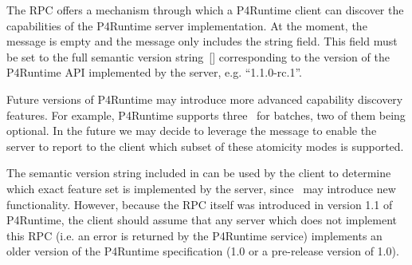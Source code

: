 \documentclass[11pt]{article}
\begin{document}
{%
\noindent{}The  RPC offers a mechanism through which a P4Runtime client can
discover the capabilities of the P4Runtime server implementation. At the moment,
the  message is empty and the 
message only includes the  string field. This field must
be set to the full semantic version string~[] corresponding to the
version of the P4Runtime API implemented by the server, e.g. \textquotedblleft{}1.1.0-rc.1\textquotedblright{}.%

Future versions of P4Runtime may introduce more advanced capability discovery
features. For example, P4Runtime supports three~ for  batches, two of them being
optional. In the future we may decide to leverage the 
message to enable the server to report to the client which subset of these
atomicity modes is supported.%

The semantic version string included in  can be used by
the client to determine which exact feature set is implemented by the server,
since~ may introduce new
functionality. However, because the  RPC itself was introduced in
version 1.1 of P4Runtime, the client should assume that any server which does
not implement this RPC (i.e. an  error is returned by the
P4Runtime service) implements an older version of the P4Runtime specification
(1.0 or a pre-release version of 1.0).%

}
\end{document}
